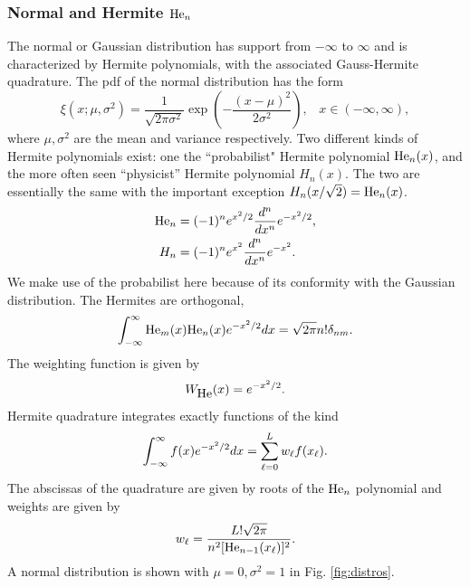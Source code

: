 \subsubsection{Normal and Hermite $\mbox{He}_n$}
The normal or Gaussian distribution has support from $-\infty$ to $\infty$ and is characterized by Hermite polynomials, with the associated Gauss-Hermite quadrature.  The pdf of the normal distribution has the form
\begin{equation}
\xi(x;\mu,\sigma^2)=\frac{1}{\sqrt{2\pi\sigma^2}}\exp\left(-\frac{(x-\mu)^2}{2\sigma^2}\right),
      \hspace{10pt} x\in(-\infty,\infty),
\end{equation}
where $\mu,\sigma^2$ are the mean and variance respectively.  Two different kinds of Hermite polynomials exist: one the ``probabilist" Hermite polynomial $\mbox{He}_n(x)$, and the more often seen ``physicist'' Hermite polynomial $H_n(x)$.  The two are essentially the same with the important exception $H_n(x/\sqrt{2})=\mbox{He}_n(x)$.
\begin{align}
\mbox{He}_n&=(-1)^n e^{x^2/2}\frac{d^n}{dx^n}e^{-x^2/2},\\
H_n&=(-1)^n e^{x^2}\frac{d^n}{dx^n}e^{-x^2}.
\end{align}
We make use of the probabilist here because of its conformity with the Gaussian distribution.  The Hermites are orthogonal,
\begin{equation}
\int_{-\infty}^\infty \mbox{He}_m(x)\mbox{He}_n(x) e^{-x^2/2}dx=\sqrt{2\pi} n! \delta_{nm}.
\end{equation}
The weighting function is given by
\begin{equation}
W_{\mbox{He}}(x)=e^{-x^2/2}.
\end{equation}
Hermite quadrature integrates exactly functions of the kind
\begin{equation}
\int_{-\infty}^\infty f(x)e^{-x^2/2}dx=\sum_{\ell=0}^L w_\ell f(x_\ell).
\end{equation}
The abscissas of the quadrature are given by roots of the $\mbox{He}_n$ polynomial and weights are given by
\begin{equation}
w_\ell = \frac{L!\sqrt{2\pi}}{n^2[\mbox{He}_{n-1}(x_\ell)]^2}.
\end{equation}
A normal distribution is shown with $\mu=0,\sigma^2=1$ in Fig. \ref{fig:distros}.

\newpage
